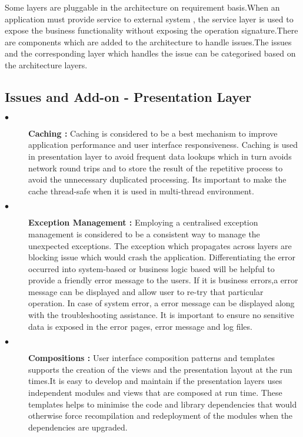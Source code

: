 			Some layers are pluggable in the architecture on requirement basis.When an application must provide service to external system , the service layer is used to expose the business functionality without exposing the operation signature.There are components which are added to the architecture to handle issues.The issues and the corresponding layer which handles the issue can be categorised based on the architecture layers.
			
\subsection{Issues and Add-on - Presentation Layer}	

\begin{description}
  \item[$\bullet$]{\bfseries Caching :} Caching is considered to be a best mechanism to improve application performance and user interface responsiveness. Caching is used in presentation layer to avoid frequent data lookups which in turn avoids network round trips and to store the result of the repetitive process to avoid the unnecessary duplicated processing. Its important to make the cache thread-safe when it is used in multi-thread environment.
  \item[$\bullet$]{\bfseries Exception Management :} Employing a centralised exception management is considered to be a consistent way to manage the unexpected exceptions. The exception which propagates across layers are blocking issue which would crash the application. Differentiating the error occurred into system-based or business logic based will be helpful to provide a friendly error message to the users. If it is business errors,a error message can be displayed and allow user to re-try that particular operation. In case of system error, a error message can be displayed along with the troubleshooting assistance. It is important to ensure no sensitive data is exposed in the error pages, error message and log files.
  \item[$\bullet$]{\bfseries Compositions :} User interface composition patterns and templates supports the creation of the views and the presentation layout at the run times.It is easy to develop and maintain if the presentation layers uses independent modules and views that are composed at run time. These templates helps to minimise the code and library dependencies that would otherwise force recompilation and redeployment of the modules when the dependencies are upgraded. 
   
\end{description}  		

